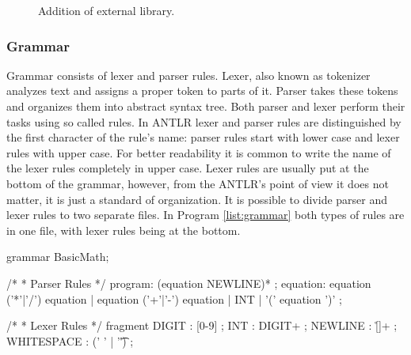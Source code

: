 \begin{figure}[hbt!]
    \centering
    \caption{Addition of external library. }
    \label{fig:jarAddition}
\end{figure}

\subsubsection{Grammar}

Grammar consists of lexer and parser rules. Lexer, also known as tokenizer analyzes text and assigns a proper token to parts of it. Parser takes these tokens and organizes them into abstract syntax tree. Both parser and lexer perform their tasks using so called rules. In ANTLR lexer and parser rules are distinguished by the first character of the rule's name: parser rules start with lower case and lexer rules with upper case. For better readability it is common to write the name of the lexer rules completely in upper case. Lexer rules are usually put at the bottom of the grammar, however, from the ANTLR's point of view it does not matter, it is just a standard of organization. It is possible to divide parser and lexer rules to two separate files. In Program \ref{list:grammar} both types of rules are in one file, with lexer rules being at the bottom. 

\begin{program} [hbt!]
    \caption{Example of grammar file's content. This grammar allows creation of simple mathematical equations. }
    \label{list:grammar}
    \begin{JavaCode}
grammar BasicMath;		

/*
 * Parser Rules
 */
program:	(equation NEWLINE)* ;
equation:	equation ('*'|'/') equation
    |	equation ('+'|'-') equation
    |	INT
    |	'(' equation ')'
    ;

/*
 * Lexer Rules
 */
fragment DIGIT : [0-9] ;
INT     : DIGIT+ ; 
NEWLINE : [\r\n]+ ;
WHITESPACE : (' ' | '\t') ;    \end{JavaCode}
\end{program}

